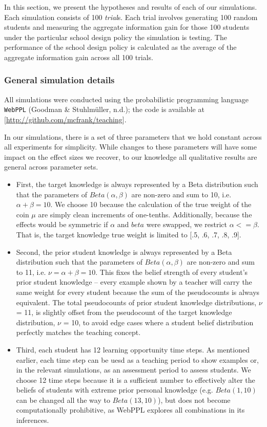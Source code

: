 \documentclass[10pt, letterpaper]{apa6}
\begin{document}
In this section, we present the hypotheses and results of each of our
simulations. Each simulation consists of 100 \emph{trial}s. Each trial
involves generating 100 random students and measuring the aggregate
information gain for those 100 students under the particular school
design policy the simulation is testing. The performance of the school
design policy is calculated as the average of the aggregate information
gain across all 100 trials.

\subsubsection{General simulation
details}\label{general-simulation-details}

All simulations were conducted using the probabilistic programming
language \texttt{WebPPL} (Goodman \& Stuhlmüller, n.d.); the code is
available at {[}\url{http://github.com/mcfrank/teaching}{]}.

In our simulations, there is a set of three parameters that we hold
constant across all experiments for simplicity. While changes to these
parameters will have some impact on the effect sizes we recover, to our
knowledge all qualitative results are general across parameter sets.

\begin{itemize}
\item
  First, the target knowledge is always represented by a Beta
  distribution such that the parameters of \(Beta(\alpha,\beta)\) are
  non-zero and sum to 10, i.e. \(\alpha + \beta = 10\). We choose 10
  because the calculation of the true weight of the coin \(\mu\) are
  simply clean increments of one-tenths. Additionally, because the
  effects would be symmetric if \(\alpha\) and \(beta\) were swapped, we
  restrict \(\alpha <= \beta\). That is, the target knowledge true
  weight is limited to {[}.5, .6, .7, .8, .9{]}.
\item
  Second, the prior student knowledge is always represented by a Beta
  distribution such that the parameters of \(Beta(\alpha,\beta)\) are
  non-zero and sum to 11, i.e. \(\nu = \alpha + \beta = 10\). This fixes
  the belief strength of every student's prior student knowledge --
  every example shown by a teacher will carry the same weight for every
  student because the sum of the pseudocounts is always equivalent. The
  total pseudocounts of prior student knowledge distributions, \(\nu\) =
  11, is slightly offset from the pseudocount of the target knowledge
  distribution, \(\nu\) = 10, to avoid edge cases where a student belief
  distribution perfectly matches the teaching concept.
\item
  Third, each student has 12 learning opportunity time steps. As
  mentioned earlier, each time step can be uesd as a teaching period to
  show examples or, in the relevant simulations, as an assessment period
  to assess students. We choose 12 time steps because it is a sufficient
  number to effectively alter the beliefs of students with extreme prior
  personal knowledge (e.g. \(Beta(1,10)\) can be changed all the way to
  \(Beta(13,10)\)), but does not become computationally prohibitive, as
  WebPPL explores all combinations in its inferences. 
\end{itemize}
\end{document}
